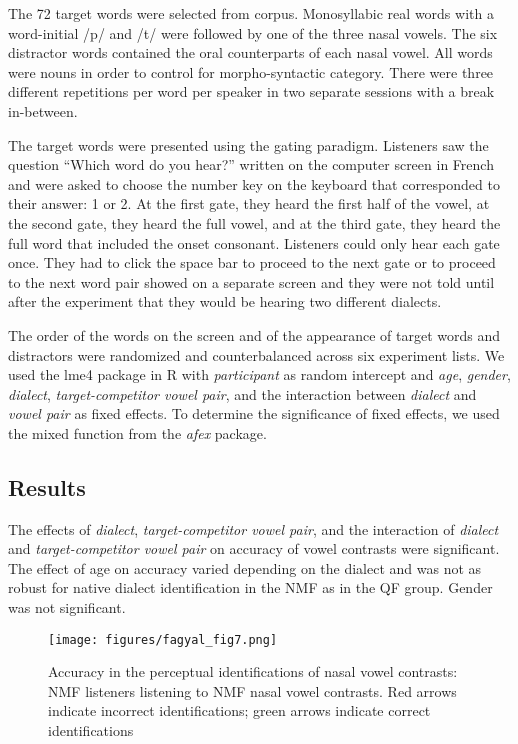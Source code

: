 \documentclass[output=paper,colorlinks,citecolor=brown]{langscibook}
\begin{document}
The 72 target words were selected from  corpus. Monosyllabic real words with a word-initial /p/ and /t/ were followed by one of the three nasal vowels. The six distractor words contained the oral counterparts of each nasal vowel. All words were nouns in order to control for morpho-syntactic category. There were three different repetitions per word per speaker in two separate sessions with a break in-between.

The target words were presented using the gating paradigm. Listeners saw the question “Which word do you hear?” written on the computer screen in French and were asked to choose the number key on the keyboard that corresponded to their answer: 1 or 2. At the first gate, they heard the first half of the vowel, at the second gate, they heard the full vowel, and at the third gate, they heard the full word that included the onset consonant. Listeners could only hear each gate once. They had to click the space bar to proceed to the next gate or to proceed to the next word pair showed on a separate screen and they were not told until after the experiment that they would be hearing two different dialects.

The order of the words on the screen and of the appearance of target words and distractors were randomized and counterbalanced across six experiment lists. We used the lme4 package in R with \textit{participant} as random intercept and \textit{age}, \textit{gender}, \textit{dialect}, \textit{target-competitor vowel pair}, and the interaction between \textit{dialect} and \textit{vowel pair} as fixed effects. To determine the significance of fixed effects, we used the mixed function from the \textit{afex} package.

\subsection{Results}
The effects of \textit{dialect}, \textit{target-competitor vowel pair}, and the interaction of \textit{dialect} and \textit{target-competitor vowel pair} on accuracy of vowel contrasts were significant. The effect of age on accuracy varied depending on the dialect and was not as robust for native dialect identification in the NMF as in the QF group. Gender was not significant.

\begin{figure}

    \texttt{[image: figures/fagyal\_fig7.png]}
    \caption{Accuracy in the perceptual identifications of nasal vowel contrasts: NMF listeners listening to NMF nasal vowel contrasts. Red arrows indicate incorrect identifications; green arrows indicate correct identifications \citep[based on][]{NicholasCarignan2019}}
    \label{fig:7}
\end{figure}
\end{document}

